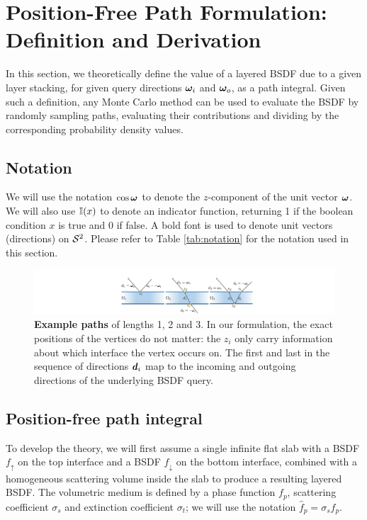 \section{Position-Free Path Formulation: Definition and Derivation}
\label{sec:path-formulation}

In this section, we theoretically define the value of a layered BSDF due to a given layer stacking, for given query directions $\bm{\omega}_i$ and $\bm{\omega}_o$, as a path integral. Given such a definition, any Monte Carlo method can be used to evaluate the BSDF by randomly sampling paths, evaluating their contributions and dividing by the corresponding probability density values.

\subsection{Notation}

We will use the notation $\cos \bm{\omega}$ to denote the $z$-component of the unit vector $\bm{\omega}$. We will also use $\mathbb{I}(x)$ to denote an indicator function, returning 1 if the boolean condition $x$ is true and 0 if false. A bold font is used to denote unit vectors (directions) on ${\mathcal S^2}$. Please refer to Table \ref{tab:notation} for the notation used in this section.

\begin{figure}
	\centering
	\includegraphics[width=\columnwidth]{images/illustration/omega.pdf}
	\caption{\label{fig:singlelayer}
		\textbf{Example paths} of lengths 1, 2 and 3.
		In our formulation, the exact positions of the vertices do not matter: the $z_i$ only carry information about which interface the vertex occurs on.
		The first and last in the sequence of directions $\bm{d}_i$ map to the incoming and outgoing directions of the underlying BSDF query.
	}
\end{figure}


\subsection{Position-free path integral}

To develop the theory, we will first assume a single infinite flat slab with a BSDF $f_\uparrow$ on the top interface and a BSDF $f_\downarrow$ on the bottom interface, combined with a homogeneous scattering volume inside the slab to produce a resulting layered BSDF. The volumetric medium is defined by a phase function $f_p$, scattering coefficient $\sigma_s$ and extinction coefficient $\sigma_t$; we will use the notation $\hat f_p = \sigma_s f_p$.

